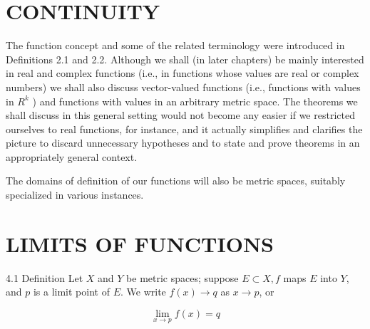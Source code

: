 \documentclass[10pt]{article}
\begin{document}
\section*{CONTINUITY}
The function concept and some of the related terminology were introduced in Definitions 2.1 and 2.2. Although we shall (in later chapters) be mainly interested in real and complex functions (i.e., in functions whose values are real or complex numbers) we shall also discuss vector-valued functions (i.e., functions with values in $R^{k}$ ) and functions with values in an arbitrary metric space. The theorems we shall discuss in this general setting would not become any easier if we restricted ourselves to real functions, for instance, and it actually simplifies and clarifies the picture to discard unnecessary hypotheses and to state and prove theorems in an appropriately general context.

The domains of definition of our functions will also be metric spaces, suitably specialized in various instances.

\section*{LIMITS OF FUNCTIONS}
4.1 Definition Let $X$ and $Y$ be metric spaces; suppose $E \subset X, f$ maps $E$ into $Y$, and $p$ is a limit point of $E$. We write $f(x) \rightarrow q$ as $x \rightarrow p$, or


\begin{equation*}
\lim _{x \rightarrow p} f(x)=q \tag{1}
\end{equation*}
\end{document}
